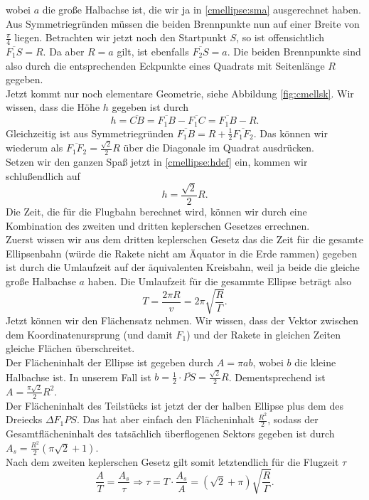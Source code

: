 \begin{Answer}[ref = cmellipse]
	wobei $a$ die große Halbachse ist, die wir ja in \eqref{cmellipse:sma} ausgerechnet haben.\\
	Aus Symmetriegründen müssen die beiden Brennpunkte nun auf einer Breite von $\frac{\pi}{4}$ liegen. Betrachten wir jetzt noch den Startpunkt $S$, so ist offensichtlich $\overline{F_1S}= R$. Da aber $R=a$ gilt, ist ebenfalls $\overline{F_2S} = a$. Die beiden Brennpunkte sind also durch die entsprechenden Eckpunkte eines Quadrats mit Seitenlänge $R$  gegeben.\\
	Jetzt kommt nur noch elementare Geometrie, siehe Abbildung \ref{fig:cmellsk}. Wir wissen, dass die Höhe $h$ gegeben ist durch 
	\begin{equation}\label{cmellipse:hdef}
		h = \overline{CB} = \overline{F_1B} - \overline{F_1C} =  \overline{F_1B} - R.
	\end{equation}
	Gleichzeitig ist aus Symmetriegründen $\overline{F_1B} = R + \frac{1}{2}\overline{F_1F_2}$. Das können wir wiederum als $\overline{F_1F_2} = \frac{\sqrt{2}}{2}R$ über die Diagonale im Quadrat ausdrücken.\\
	Setzen wir den ganzen Spaß jetzt in \eqref{cmellipse:hdef} ein, kommen wir schlußendlich auf
	\begin{equation}\label{cmellipse:maxh}
		\boxed{h = \frac{\sqrt{2}}{2}R.}
	\end{equation}
	\Question Die Zeit, die für die Flugbahn berechnet wird, können wir durch eine Kombination des zweiten und dritten keplerschen Gesetzes errechnen. \\
	Zuerst wissen wir aus dem dritten keplerschen Gesetz das die Zeit für die gesamte Ellipsenbahn (würde die Rakete nicht am Äquator in die Erde rammen) gegeben ist durch die Umlaufzeit auf der äquivalenten Kreisbahn, weil ja beide die gleiche große Halbachse $a$ haben. Die Umlaufzeit für die gesammte Ellipse beträgt also
	\begin{equation}\label{cmellipse:tfull}
		T = \frac{2\pi R}{v} = 2\pi \sqrt{\frac{R}{{\Gamma}}}.
	\end{equation}
	Jetzt können wir den Flächensatz nehmen. Wir wissen, dass der Vektor zwischen dem Koordinatenursprung (und damit $F_1$) und der Rakete in gleichen Zeiten gleiche Flächen überschreitet.\\
	Der Flächeninhalt der Ellipse ist gegeben durch $A = \pi ab$, wobei $b$ die kleine Halbachse ist. In unserem Fall ist $b = \frac{1}{2}\cdot \overline{PS}  = \frac{\sqrt{2}}{2}R$. Dementsprechend ist $A = \frac{\pi\sqrt{2}}{2}R^2$.\\
	Der Flächeninhalt des Teilstücks ist jetzt der der halben Ellipse plus dem des Dreiecks $\Delta F_1PS$. Das hat aber einfach den Flächeninhalt $\frac{R^2}{2}$, sodass der Gesamtflächeninhalt des tatsächlich überflogenen Sektors gegeben ist durch $A_s = \frac{R^2}{2}\left(\pi \sqrt{2} + 1\right)$.\\
	Nach dem zweiten keplerschen Gesetz gilt somit letztendlich für die Flugzeit $\tau$
	\begin{equation}
		\boxed{\frac{A}{T} = \frac{A_s}{\tau} \Rightarrow \tau = T\cdot \frac{A_s}{A} = \left(\sqrt{2}+ \pi\right) \sqrt{\frac{R}{\Gamma}}.}
	\end{equation}
\end{Answer}